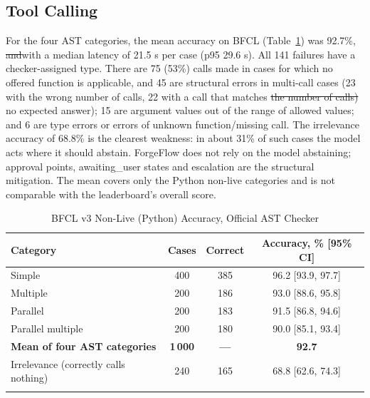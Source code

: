 \documentclass[pdflatex,sn-mathphys-num]{sn-jnl}%
\newcommand{\fix}[1]{{\color{fixcol}#1}}
\newcommand{\fixdel}[1]{{\color{fixcol}\sout{#1}}}
\newcommand{\rw}[2]{{\color{rwcol}#1}}%
\theoremstyle{thmstyleone}%
\theoremstyle{thmstyletwo}%
\theoremstyle{thmstylethree}%
\begin{document}
\subsection{Tool Calling}\label{sec8.4}

\rw{For the four AST categories, the mean accuracy on BFCL (Table~\ref{tab5}) was 92.7\%, \fixdel{and}\fix{with} a median latency of 21.5 s per case (p95 29.6 s). All 141 failures have a checker-assigned \fix{type}. There are 75 (53\%) \fix{calls made in} cases for which no offered function is applicable, and 45 are structural errors in multi-call cases (23 with the wrong number of calls, 22 with a call that matches \fixdel{the number of calls)} no expected answer); 15 are argument values out of the range of allowed values; and 6 are type\fix{ errors or} errors of unknown function/missing call.}{On BFCL (Table~\ref{tab5}), mean accuracy over the four AST categories was 92.7\%, with a median latency of 21.5 s per case (p95 29.6 s). All 141 failures carry a checker-assigned type: 75 (53\%) are calls made where no offered function fits; 45 are structural errors in multi-call cases (23 with the wrong number of calls, 22 with a call that matches no expected answer); 15 are argument values outside the allowed set; and 6 are type, unknown-function or missing-call errors.} The irrelevance accuracy of 68.8\% is the clearest weakness: in about 31\% of such cases the model acts where it should abstain. ForgeFlow does not rely on the model abstaining; approval points, awaiting\_user states and escalation are the structural mitigation. The mean covers only the Python non-live categories and is not comparable with the leaderboard's overall score.

\begin{table}[t]
\caption{BFCL v3 Non-Live (Python) Accuracy, Official AST Checker}\label{tab5}%
\small
\begin{tabular*}{\textwidth}{@{\extracolsep\fill}lccc@{}}
\toprule
\textbf{Category} & \textbf{Cases} & \textbf{Correct} & \textbf{Accuracy, \% [95\% CI]} \\
\midrule
Simple & 400 & 385 & 96.2 [93.9, 97.7] \\
Multiple & 200 & 186 & 93.0 [88.6, 95.8] \\
Parallel & 200 & 183 & 91.5 [86.8, 94.6] \\
Parallel multiple & 200 & 180 & 90.0 [85.1, 93.4] \\
\textbf{Mean of four AST categories} & \textbf{1\,000} & \textbf{---} & \textbf{92.7} \\
Irrelevance (correctly calls nothing) & 240 & 165 & 68.8 [62.6, 74.3] \\
\botrule
\end{tabular*}
\end{table}
\end{document}
